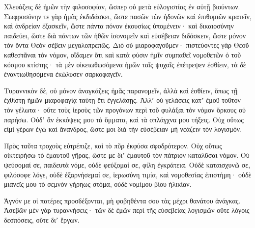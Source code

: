 {\par }{\PP {}Χλευάζεις δὲ ἡμῶν τὴν φιλοσοφίαν, ὥσπερ οὐ μετὰ εὐλογιστίας ἐν αὐτῇ βιούντων.
Σωφροσύνην τε γὰρ ἡμᾶς ἐκδιδάσκει, ὥστε πασῶν τῶν ἡδονῶν καὶ ἐπιθυμιῶν κρατεῖν, καὶ ἀνδρείαν ἐξασκεῖν, ὥστε πάντα πόνον ἑκουσίως ὑπομένειν·
καὶ δικαιοσύνην παιδεύει, ὥστε διὰ πάντων τῶν ἠθῶν ἰσονομεῖν καὶ εὐσέβειαν διδάσκειν, ὥστε μόνον τὸν ὄντα Θεὸν σέβειν μεγαλοπρεπῶς.
Διὸ οὐ μιαροφαγοῦμεν· πιστεύοντες γὰρ Θεοῦ καθεστᾶναι τὸν νόμον, οἴδαμεν ὅτι καὶ κατὰ φύσιν ἡμῖν συμπαθεῖ νομοθετῶν ὁ τοῦ κόσμου κτίστης·
τὰ μὲν οἰκειωθωσόμενα ἡμῶν ταῖς ψυχαῖς ἐπέτρεψεν ἐσθίειν, τὰ δὲ ἐναντιωθησόμενα ἐκώλυσεν σαρκοφαγεῖν.
\par }{\PP {}Τυραννικὸν δὲ, οὐ μόνον ἀναγκάζεις ἡμᾶς παρανομεῖν, ἀλλὰ καὶ ἐσθίειν, ὅπως τῇ ἐχθίστῃ ἡμῶν μιαροφαγίᾳ ταύτῃ ἔτι ἐγγελάσῃς.
Ἀλλʼ οὐ γελάσεις κατʼ ἐμοῦ τοῦτον τὸν γέλωτα·
οὔτε τοὺς ἱεροὺς τῶν προγόνων περὶ τοῦ φυλάξαι τὸν νόμον ὅρκους οὐ παρήσω.
Οὐδʼ ἂν ἐκκόψεις μου τὰ ὄμματα, καὶ τὰ σπλάγχνα μου τήξεις.
Οὐχ οὕτως εἰμὶ γέρων ἐγὼ καὶ ἄνανδρος, ὥστε μοι διὰ τὴν εὐσέβειαν μὴ νεάζειν τὸν λογισμόν.
\par }{\PP {}Πρὸς ταῦτα τροχοὺς εὐτρέπιζε, καὶ τὸ πῦρ ἐκφύσα σφοδρότερον.
Οὐχ οὕτως οἰκτειρήσω τὸ ἐμαυτοῦ γῆρας, ὥστε με διʼ ἐμαυτοῦ τὸν πάτριον καταλῦσαι νόμον.
Οὐ ψεύσομαί σε, παιδευτὰ νόμε, οὐδὲ φεύξομαί σε, φίλη ἐγκράτεια.
Οὐδὲ καταισχυνῶ σε, φιλόσοφε λόγε, οὐδὲ ἐξαρνήσεμαί σε, ἱερωσύνη τιμία, καὶ νομοθεσίας ἐπιστήμη·
οὐδὲ μιανεῖς μου τὸ σεμνὸν γήρηως στόμα, οὐδὲ νομίμου βίου ἡλικίαν.
\par }{\PP {}Ἁγνόν με οἱ πατέρες προσδέξονται, μὴ φοβηθέντα σου τὰς μέχρι θανάτου ἀνάγκας.
Ἀσεβῶν μὲν γὰρ τυραννήσεις· τῶν δὲ ἐμῶν περὶ τῆς εὐσεβείας λογισμῶν οὔτε λόγοις δεσπόσεις, οὔτε διʼ ἔργων.

}
